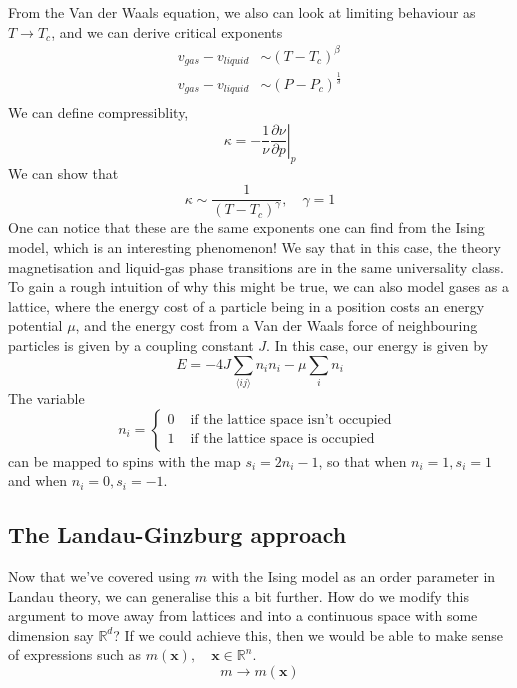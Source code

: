 \documentclass[11pt, oneside]{article}   	%
\begin{document}
From the Van der Waals equation, we also can look at limiting behaviour as $T \rightarrow T_c $, and we can derive critical exponents
\begin{align*} 
v_{gas}  - v_{liquid} & \sim (T - T_c)^\beta \\
v_{gas}  - v_{liquid } &  \sim (P - P_c)^{\frac{ 1}{ \delta } } \\
\end{align*} We can define compressiblity, 
\[ 
\kappa =  - \frac{1}{ \nu } \left.  \frac{ \partial \nu }{ \partial p } \right\vert_p 
\] 
We can show that \[ 
\kappa \sim \frac{1}{ (T - T_c)^{ \gamma} } , \quad \gamma  = 1 
\]
One can notice that these are the same exponents one can find from the Ising model, which is an interesting phenomenon! We say that in this case, the theory magnetisation and liquid-gas phase transitions are in the same universality class. To gain a rough intuition of why this might be true, we can also model gases as a lattice, where the energy cost of a particle being in a position costs an energy potential $\mu$, and the energy cost from a Van der Waals force of neighbouring particles is given by a coupling constant $J$. In this case, our energy is given by 
\[ 
E =  - 4J \sum_{ \langle ij \rangle} n_i n_i  - \mu \sum_i n_i
\] 
The variable 
\[ 
n_i = \begin{cases} 
	0 & \text{ if the lattice space isn't occupied } \\
	1 & \text{ if the lattice space is occupied } 
	\end{cases} 
\] can be mapped to spins with the map $ s_i = 2n_i - 1$, so that when $n_i = 1, s_i =1 $ and when  $n_i   = 0, s_i = -1$. 

\pagebreak 
\subsection{The Landau-Ginzburg approach} 
Now that we've covered using $m$ with the Ising model as an order parameter in Landau theory, we can generalise this a bit further. How do we modify this argument to move away from lattices and into a continuous space with some dimension say $\mathbb{R}^d$? If we could achieve this, then we would be able to make sense of expressions such as $m(\mathbf{x}), \quad \mathbf{x} \in \mathbb{R}^n$. 
\[ 
m \rightarrow m(\mathbf{x} ) 
\] 
\end{document}

